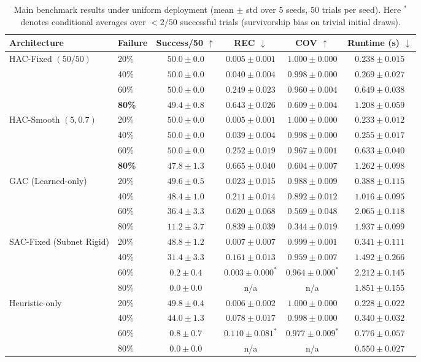 \documentclass[11pt]{article}
\theoremstyle{plain}
\theoremstyle{definition}
\theoremstyle{remark}
\begin{document}
\begin{table}[t]
\centering
\caption{Main benchmark results under uniform deployment (mean $\pm$ std over 5 seeds, 50 trials per seed). Here $^*$ denotes conditional averages over $<2/50$ successful trials (survivorship bias on trivial initial draws).}
\label{tab:main-uniform}
\scriptsize
\begin{tabular}{@{}llcccc@{}}
\toprule
Architecture & Failure & Success/50 $\uparrow$ & REC $\downarrow$ & COV $\uparrow$ & Runtime (s) $\downarrow$ \\
\midrule
\multirow{4}{*}{HAC-Fixed $(50/50)$}
 & 20\% & $50.0\pm0.0$ & $0.005\pm0.001$ & $1.000\pm0.000$ & $0.238\pm0.015$ \\
 & 40\% & $50.0\pm0.0$ & $0.040\pm0.004$ & $0.998\pm0.000$ & $0.269\pm0.027$ \\
 & 60\% & $50.0\pm0.0$ & $0.249\pm0.023$ & $0.960\pm0.004$ & $0.649\pm0.038$ \\
 & \textbf{80\%} & $\mathbf{49.4\pm0.8}$ & $\mathbf{0.643\pm0.026}$ & $\mathbf{0.609\pm0.004}$ & $\mathbf{1.208\pm0.059}$ \\
\midrule
\multirow{4}{*}{HAC-Smooth $(5, 0.7)$}
 & 20\% & $50.0\pm0.0$ & $0.005\pm0.001$ & $1.000\pm0.000$ & $0.233\pm0.012$ \\
 & 40\% & $50.0\pm0.0$ & $0.039\pm0.004$ & $0.998\pm0.000$ & $0.255\pm0.017$ \\
 & 60\% & $50.0\pm0.0$ & $0.252\pm0.019$ & $0.967\pm0.001$ & $0.633\pm0.040$ \\
 & \textbf{80\%} & $47.8\pm1.3$ & $0.665\pm0.040$ & $0.604\pm0.007$ & $1.262\pm0.098$ \\
\midrule
\multirow{4}{*}{GAC (Learned-only)}
 & 20\% & $49.6\pm0.5$ & $0.023\pm0.015$ & $0.988\pm0.009$ & $0.388\pm0.115$ \\
 & 40\% & $48.4\pm1.0$ & $0.211\pm0.014$ & $0.892\pm0.012$ & $1.016\pm0.095$ \\
 & 60\% & $36.4\pm3.3$ & $0.620\pm0.068$ & $0.569\pm0.048$ & $2.065\pm0.118$ \\
 & 80\% & $11.2\pm3.7$ & $0.839\pm0.039$ & $0.344\pm0.019$ & $1.937\pm0.099$ \\
\midrule
\multirow{4}{*}{SAC-Fixed (Subnet Rigid)}
 & 20\% & $48.8\pm1.2$ & $0.007\pm0.007$ & $0.999\pm0.001$ & $0.341\pm0.111$ \\
 & 40\% & $31.4\pm3.3$ & $0.161\pm0.013$ & $0.959\pm0.007$ & $1.492\pm0.266$ \\
 & 60\% & $0.2\pm0.4$  & $0.003\pm0.000^*$ & $0.964\pm0.000^*$ & $2.212\pm0.145$ \\
 & 80\% & $0.0\pm0.0$  & n/a & n/a & $1.851\pm0.155$ \\
\midrule
\multirow{4}{*}{Heuristic-only}
 & 20\% & $49.8\pm0.4$ & $0.006\pm0.002$ & $1.000\pm0.000$ & $0.228\pm0.022$ \\
 & 40\% & $44.0\pm1.3$ & $0.078\pm0.017$ & $0.998\pm0.000$ & $0.340\pm0.032$ \\
 & 60\% & $0.8\pm0.7$  & $0.110\pm0.081^*$ & $0.977\pm0.009^*$ & $0.776\pm0.057$ \\
 & 80\% & $0.0\pm0.0$  & n/a & n/a & $0.550\pm0.027$ \\
\bottomrule
\end{tabular}
\end{table}
\end{document}
